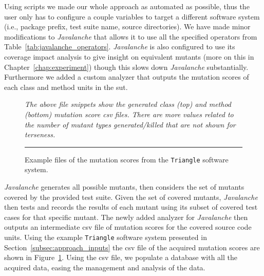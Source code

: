 Using scripts we made our whole approach as automated as possible, thus the user only has to configure a couple variables to target a different software system (i.e., package prefix, test suite name, source directories). We have made minor modifications to \emph{Javalanche} that allows it to use all the specified operators from Table~\ref{tab:javalanche_operators}. \emph{Javalanche} is also configured to use its coverage impact analysis to give insight on equivalent mutants (more on this in Chapter~\ref{chap:experiment}) though this slows down \emph{Javalanche} substantially. Furthermore we added a custom analyzer that outputs the mutation scores of each class and method units in the \gls{sut}.

\begin{figure}[!tb]
  \centering
  
  
  \caption{Example  files of the mutation scores from the \texttt{Triangle} software system.}
  \vspace{1mm}
  \footnotesize{\emph{The above file snippets show the generated class (top) and method (bottom) mutation score \gls{csv} files. There are more values related to the number of mutant types generated/killed that are not shown for terseness.}}
  \vspace{2mm}
  \hrule
  \label{fig:triangle_mutation_scores}
\end{figure}

\emph{Javalanche} generates all possible mutants, then considers the set of mutants covered by the provided test suite. Given the set of covered mutants, \emph{Javalanche} then tests and records the results of each mutant using its subset of covered test cases for that specific mutant. The newly added analyzer for \emph{Javalanche} then outputs an intermediate \gls{csv} file of mutation scores for the covered source code units. Using the example \texttt{Triangle} software system presented in Section~\ref{subsec:approach_inputs} the \gls{csv} file of the acquired mutation scores are shown in Figure~\ref{fig:triangle_mutation_scores}. Using the \gls{csv} file, we populate a database with all the acquired data, easing the management and analysis of the data.


